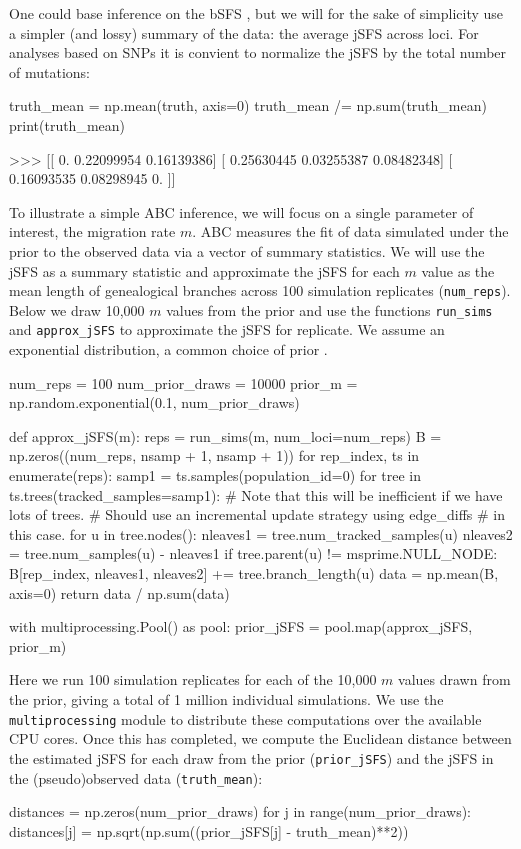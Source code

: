 \documentclass[graybox]{svmult}
\begin{document}
    One could base inference on the bSFS \citep{Lohse2016, Beeravolu2017}, but we will for the sake of simplicity use a simpler (and lossy)
summary of the data: the average jSFS across loci. For analyses based on
SNPs it is convient to normalize the jSFS by the total number of
mutations:
\begin{pythoncode}
truth_mean = np.mean(truth, axis=0)
truth_mean /= np.sum(truth_mean)
print(truth_mean)

>>> [[ 0.          0.22099954  0.16139386]
     [ 0.25630445  0.03255387  0.08482348]
     [ 0.16093535  0.08298945  0.        ]]
\end{pythoncode}

    To illustrate a simple ABC inference, we will focus on a single
parameter of interest, the migration rate \(m\).
ABC measures the fit of data simulated under the prior to the observed
data via a vector of summary statistics. We will use the jSFS as a
summary statistic and approximate the jSFS for each \(m\) value as the
mean length of genealogical branches across 100 simulation replicates (\texttt{num\_reps}). Below we
draw 10,000 \(m\) values from the prior and use the functions
\texttt{run\_sims} and \texttt{approx\_jSFS} to approximate the jSFS for
 replicate. We assume an exponential distribution, a common choice of prior
\citep{hey2004multilocus}.

\begin{pythoncode}
num_reps = 100
num_prior_draws = 10000
prior_m = np.random.exponential(0.1, num_prior_draws)

def approx_jSFS(m):
    reps = run_sims(m, num_loci=num_reps)
    B = np.zeros((num_reps, nsamp + 1, nsamp + 1))
    for rep_index, ts in enumerate(reps):
        samp1 = ts.samples(population_id=0)
        for tree in ts.trees(tracked_samples=samp1):
            # Note that this will be inefficient if we have lots of trees.
            # Should use an incremental update strategy using edge_diffs
            # in this case.
            for u in tree.nodes():
                nleaves1 = tree.num_tracked_samples(u)
                nleaves2 = tree.num_samples(u) - nleaves1
                if tree.parent(u) != msprime.NULL_NODE:
                    B[rep_index, nleaves1, nleaves2] += tree.branch_length(u)
    data = np.mean(B, axis=0)
    return data / np.sum(data)

with multiprocessing.Pool() as pool:
    prior_jSFS = pool.map(approx_jSFS, prior_m)
\end{pythoncode}

Here we run 100 simulation replicates for each of the 10,000
$m$ values drawn from the prior, giving a total of 1 million individual simulations.
We use the \texttt{multiprocessing} module to distribute these
computations over the available CPU cores.
Once this has completed, we compute the Euclidean distance between the estimated jSFS for each
draw from the prior (\texttt{prior\_jSFS}) and the jSFS in the (pseudo)observed
data (\texttt{truth\_mean}):
\begin{pythoncode}
distances = np.zeros(num_prior_draws)
for j in range(num_prior_draws):
    distances[j] = np.sqrt(np.sum((prior_jSFS[j] - truth_mean)**2))
\end{pythoncode}
\end{document}
